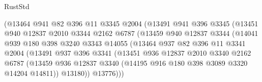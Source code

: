 \begin{lexlean}{RustStd}
\begin{coremodule}
{\begin{coremodule}
{{{{{{{{{{{{{{{{{{{{{{{{{{{{{{{                                (@13464
                                  @941
                                  @82
                                  @396
                                  @11
                                  @3345
                                  @2004
                                  (@13491
                                    @941
                                    @396
                                    @3345
                                    (@13451
                                      @940
                                      @12837
                                      @2010
                                      @3344
                                      @2162
                                      @6787
                                      (@13459
                                        @940
                                        @12837
                                        @3344
                                        (@14041
                                          @939
                                          @180
                                          @398
                                          @3240
                                          @3343
                                          @14055
                                          (@13464
                                            @937
                                            @82
                                            @396
                                            @11
                                            @3341
                                            @2004
                                            (@13491
                                              @937
                                              @396
                                              @3341
                                              (@13451
                                                @936
                                                @12837
                                                @2010
                                                @3340
                                                @2162
                                                @6787
                                                (@13459
                                                  @936
                                                  @12837
                                                  @3340
                                                  (@14195 @916 @180 @398 @3089 @3320 @14204 @14811))
                                                @13180))
                                            @13776)))
}}}}}}}}}}}}}}}}}}}}}}}}}}}}}}}
\end{coremodule}}
\end{coremodule}
\end{lexlean}
